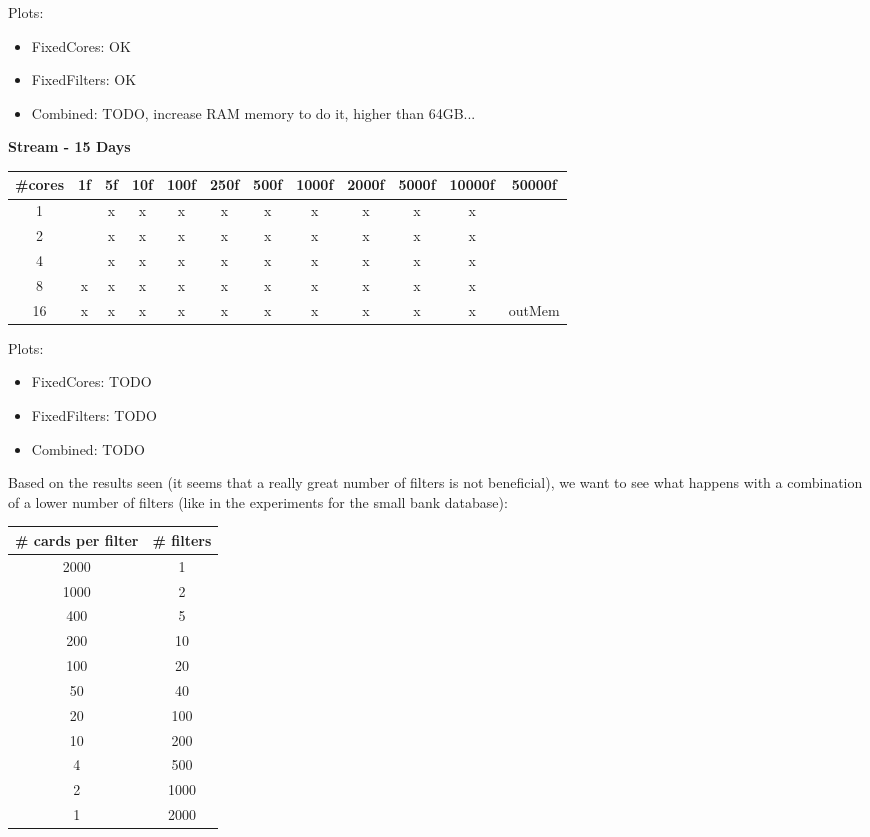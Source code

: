 Plots:
\begin{itemize}
    \item FixedCores: OK
    \item FixedFilters: OK
    \item Combined: TODO, increase RAM memory to do it, higher than 64GB...
\end{itemize}



\textbf{Stream - 15 Days}
\begin{table}[H]
  \begin{tabular}{|c|c|c|c|c|c|c|c|c|c|c|c|}
  \hline
  \#cores & 1f & 5f & 10f & 100f & 250f & 500f & 1000f & 2000f & 5000f & 10000f & 50000f \\ \hline
  1       &   & x & x & x & x & x & x & x & x & x &        \\ \hline
  2       &   & x & x & x & x & x & x & x & x & x &        \\ \hline
  4       &   & x & x & x & x & x & x & x & x & x &       \\ \hline
  8       & x & x & x & x & x & x & x & x & x & x &        \\ \hline
  16      & x & x & x & x & x & x & x & x & x & x & outMem \\ \hline
  \end{tabular}
\end{table}

Plots:
\begin{itemize}
    \item FixedCores: TODO
    \item FixedFilters: TODO
    \item Combined: TODO
\end{itemize}
  

Based on the results seen (it seems that a really great number of filters is not beneficial), we want to see what happens with a combination of a lower number of filters (like in the experiments for the small bank database):


\begin{table}[H]
    \renewcommand{\arraystretch}{1.5} %
    \centering
    \begin{tabular}{|c|c|}
    \hline
    \# cards per filter & \# filters \\ \hline
    2000   &   1     \\ \hline
    1000   &   2     \\ \hline
    400 &   5     \\ \hline
    200  &   10     \\ \hline
    100 &   20    \\ \hline
    50  &   40    \\ \hline
    20  &   100    \\ \hline
    10  &   200    \\ \hline
    4  &   500    \\ \hline
    2  &   1000    \\ \hline
    1  &   2000    \\ \hline
    \end{tabular}
\end{table}


